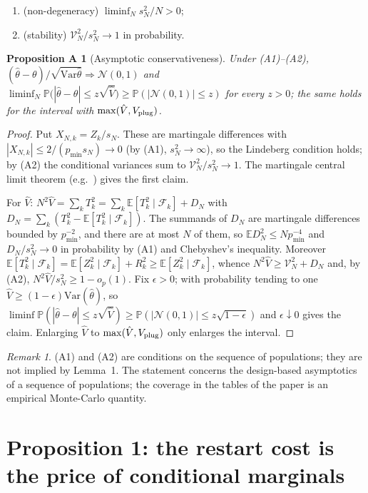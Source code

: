\documentclass[11pt]{article}
\newtheorem{asym}{Proposition A}
\theoremstyle{remark}
\newtheorem{remark}{Remark}
\newcommand{\E}{\mathbb{E}}
\renewcommand{\Pr}{\mathbb{P}}
\newcommand{\Var}{\mathrm{Var}}
\newcommand{\Fk}{\mathcal F}
\newcommand{\hth}{\hat\theta}
\newcommand{\hV}{\hat V}
\begin{document}
\begin{enumerate}[label=(A\arabic*)]
\item (non-degeneracy) $\liminf_N s_N^2/N>0$;
\item (stability) $\mathcal V_N^2/s_N^2\to1$ in probability.
\end{enumerate}

\begin{asym}[Asymptotic conservativeness]\label{cor:clt}
Under (A1)--(A2), $(\hth-\theta)/\sqrt{\Var\hth}\Rightarrow\mathcal N(0,1)$ and $\liminf_N\Pr\big(|\hth-\theta|\le z\sqrt{\hV}\big)\ge\Pr(|\mathcal N(0,1)|\le z)$ for every $z>0$; the same holds for the interval with $\max(\hV,V_{\rm plug})$.
\end{asym}

\begin{proof}
Put $X_{N,k}=Z_k/s_N$. These are martingale differences with $|X_{N,k}|\le2/(p_{\min}s_N)\to0$ (by (A1), $s_N^2\to\infty$), so the Lindeberg condition holds; by (A2) the conditional variances sum to $\mathcal V_N^2/s_N^2\to1$. The martingale central limit theorem (e.g.\ \cite[Cor.~3.1]{hallheyde1980}) gives the first claim.

For $\hV$: $N^2\hV=\sum_kT_k^2=\sum_k\E[T_k^2\mid\Fk_k]+D_N$ with $D_N=\sum_k(T_k^2-\E[T_k^2\mid\Fk_k])$. The summands of $D_N$ are martingale differences bounded by $p_{\min}^{-2}$, and there are at most $N$ of them, so $\E D_N^2\le Np_{\min}^{-4}$ and $D_N/s_N^2\to0$ in probability by (A1) and Chebyshev's inequality. Moreover $\E[T_k^2\mid\Fk_k]=\E[Z_k^2\mid\Fk_k]+R_k^2\ge\E[Z_k^2\mid\Fk_k]$, whence $N^2\hV\ge\mathcal V_N^2+D_N$ and, by (A2), $N^2\hV/s_N^2\ge1-o_p(1)$. Fix $\epsilon>0$; with probability tending to one $\hV\ge(1-\epsilon)\Var(\hth)$, so $\liminf\Pr(|\hth-\theta|\le z\sqrt{\hV})\ge\Pr(|\mathcal N(0,1)|\le z\sqrt{1-\epsilon})$ and $\epsilon\downarrow0$ gives the claim. Enlarging $\hV$ to $\max(\hV,V_{\rm plug})$ only enlarges the interval.
\end{proof}

\begin{remark}
(A1) and (A2) are conditions on the sequence of populations; they are not implied by Lemma~1. The statement concerns the design-based asymptotics of a sequence of populations; the coverage in the tables of the paper is an empirical Monte-Carlo quantity.
\end{remark}

\section{Proposition 1: the restart cost is the price of conditional marginals}\label{sec:prop1}
\end{document}
